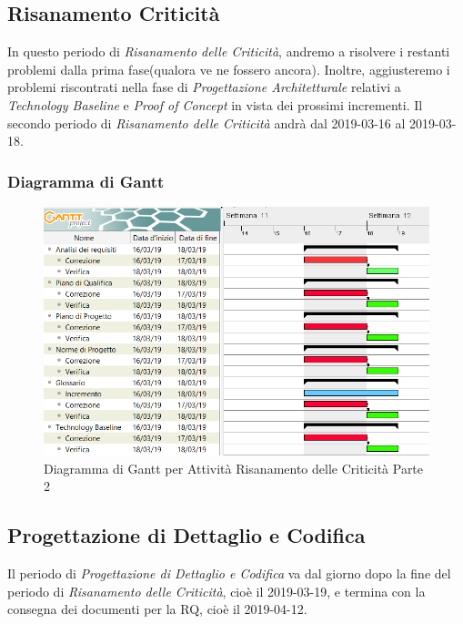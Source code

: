 \subsection{Risanamento Criticità}
\label{RC2}
In questo periodo di \textit{Risanamento delle Criticità}, andremo a risolvere i restanti problemi dalla prima fase(qualora ve ne fossero ancora). Inoltre, aggiusteremo i problemi riscontrati nella fase di \textit{Progettazione Architetturale} relativi a \textit{Technology Baseline} e \textit{Proof of Concept} in vista dei prossimi incrementi.
Il secondo periodo di \textit{Risanamento delle Criticità} andrà dal 2019-03-16 al 2019-03-18.

\subsubsection{Diagramma di Gantt}

\begin{figure}[h]
	\centering
  		\includegraphics[width=1.0\linewidth]{./images/RisanamentoCriticita2.png}
  		\caption{Diagramma di Gantt per Attività Risanamento delle Criticità Parte 2}
  		\label{fig:Gantt Risananmento Criticità 2}
\end{figure}

\newpage
\subsection{Progettazione di Dettaglio e Codifica}
\label{PDC}
Il periodo di \textit{Progettazione di Dettaglio e Codifica} va dal giorno dopo la fine del periodo di \textit{Risanamento delle Criticità}, cioè il 2019-03-19, e termina con la consegna dei documenti per la RQ, cioè il 2019-04-12.\\

